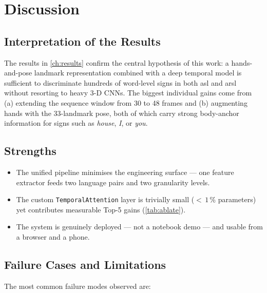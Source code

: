 \chapter{Discussion}
\label{ch:discussion}

\section{Interpretation of the Results}
\label{sec:disc:interpret}

The results in \cref{ch:results} confirm the central hypothesis of this
work: a hands-and-pose landmark representation combined with a deep
temporal model is sufficient to discriminate hundreds of word-level signs
in both \gls{asl} and \gls{arsl} without resorting to heavy 3-D CNNs. The
biggest individual gains come from (a) extending the sequence window
from 30 to 48 frames and (b) augmenting hands with the 33-landmark pose,
both of which carry strong body-anchor information for signs such as
\emph{house}, \emph{I}, or \emph{you}.

\section{Strengths}
\label{sec:disc:strengths}

\begin{itemize}
  \item The unified pipeline minimises the engineering surface --- one
        feature extractor feeds two language pairs and two granularity
        levels.
  \item The custom \texttt{TemporalAttention} layer is trivially small
        ($<\,1$\,\% parameters) yet contributes measurable Top-5 gains
        (\cref{tab:ablate}).
  \item The system is genuinely deployed --- not a notebook demo --- and
        usable from a browser and a phone.
\end{itemize}

\section{Failure Cases and Limitations}
\label{sec:disc:limits}

The most common failure modes observed are:

